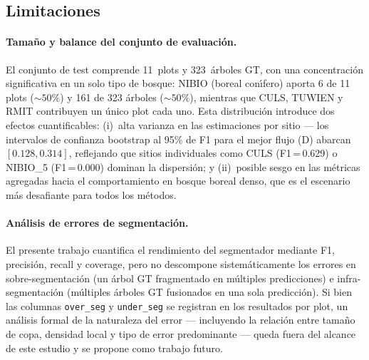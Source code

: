 \documentclass[runningheads]{llncs}
\begin{document}
\subsection{Limitaciones}

\paragraph{Tama\~no y balance del conjunto de evaluaci\'on.}
El conjunto de test comprende 11~plots y 323~\'arboles GT, con una concentraci\'on significativa en un solo tipo de bosque: NIBIO (boreal con\'\i{}fero) aporta 6 de 11 plots (${\sim}50\%$) y 161 de 323 \'arboles (${\sim}50\%$), mientras que CULS, TUWIEN y RMIT contribuyen un \'unico plot cada uno. Esta distribuci\'on introduce dos efectos cuantificables: (i)~alta varianza en las estimaciones por sitio --- los intervalos de confianza bootstrap al 95\% de F1 para el mejor flujo (D) abarcan $[0.128, 0.314]$, reflejando que sitios individuales como CULS (F1\,=\,0.629) o NIBIO\_5 (F1\,=\,0.000) dominan la dispersi\'on; y (ii)~posible sesgo en las m\'etricas agregadas hacia el comportamiento en bosque boreal denso, que es el escenario m\'as desafiante para todos los m\'etodos.

\paragraph{An\'alisis de errores de segmentaci\'on.}
El presente trabajo cuantifica el rendimiento del segmentador mediante F1, precisi\'on, recall y coverage, pero no descompone sistem\'aticamente los errores en sobre-segmentaci\'on (un \'arbol GT fragmentado en m\'ultiples predicciones) e infra-segmentaci\'on (m\'ultiples \'arboles GT fusionados en una sola predicci\'on). Si bien las columnas \texttt{over\_seg} y \texttt{under\_seg} se registran en los resultados por plot, un an\'alisis formal de la naturaleza del error --- incluyendo la relaci\'on entre tama\~no de copa, densidad local y tipo de error predominante --- queda fuera del alcance de este estudio y se propone como trabajo futuro.
\end{document}
